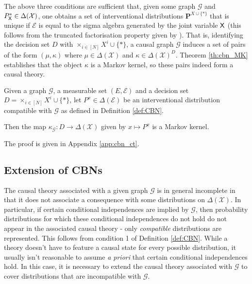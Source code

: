 The above three conditions are sufficient that, given some graph $\mathcal{G}$ and $P^*_{\mathsf{X}}\in \Delta(\mathcal{X})$, one obtains a set of interventional distributions $\mathbf{P}^{X\cup\{*\}}$ that is unique if $\mathcal{E}$ is equal to the sigma algebra generated by the joint variable $\mathsf{X}$ (this follows from the truncated factorisation property given by \cite{pearl_causality:_2009}). That is, identifying the decision set $D$ with $\times_{i\in [N]} X^i\cup\{*\}$, a causal graph $\mathcal{G}$ induces a set of pairs of the form $(\mu,\kappa)$ where $\mu\in \Delta(\mathcal{X})$ and $\kappa\in \Delta(\mathcal{X})^D$. Theorem \ref{th:cbn_MK} establishes that the object $\kappa$ is a Markov kernel, so these pairs indeed  form a causal theory.

\begin{theorem}\label{th:cbn_MK}
Given a graph $\mathcal{G}$, a measurable set $(E,\mathcal{E})$ and a decision set $D=\times_{i\in [N]} X^i\cup\{*\}$, let $P^x\in \Delta(\mathcal{E})$ be an interventional distribution compatible with $\mathcal{G}$ as defined in Definition \ref{def:CBN}. 

Then the map $\kappa_{\mathcal{G}}:D\to \Delta(\mathcal{X})$ given by $x\mapsto P^x$ is a Markov kernel.
\end{theorem}

The proof is given in Appendix \ref{app:cbn_ct}.

\subsection{Extension of CBNs}

The causal theory associated with a given graph $\mathcal{G}$ is in general incomplete in that it does not associate a consequence with some distributions on $\Delta(\mathcal{X})$. In particular, if certain conditional independences are implied by $\mathcal{G}$, then probability distributions for which these conditional independences do not hold do not appear in the associated causal theory - only \emph{compatible} distributions are represented. This follows from condition 1 of Definition \ref{def:CBN}. While a theory doesn't have to feature a causal state for every possible distribution, it usually isn't reasonable to assume \emph{a priori} that certain conditional independences hold. In this case, it is necessary to extend the causal theory associated with $\mathcal{G}$ to cover distributions that are incompatible with $\mathcal{G}$.

